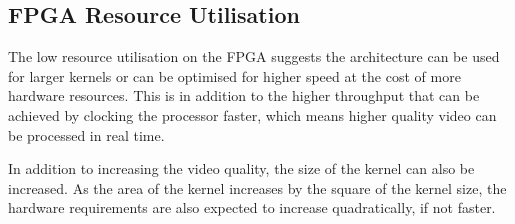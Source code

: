 \subsection{FPGA Resource Utilisation}
The low resource utilisation on the FPGA suggests the architecture can be used for larger kernels or can be optimised for higher speed at the cost of more hardware resources.
This is in addition to the higher throughput that can be achieved by clocking the processor faster, which means higher quality video can be processed in real time.

In addition to increasing the video quality, the size of the kernel can also be increased.
As the area of the kernel increases by the square of the kernel size,
the hardware requirements are also expected to increase quadratically,
if not faster.
